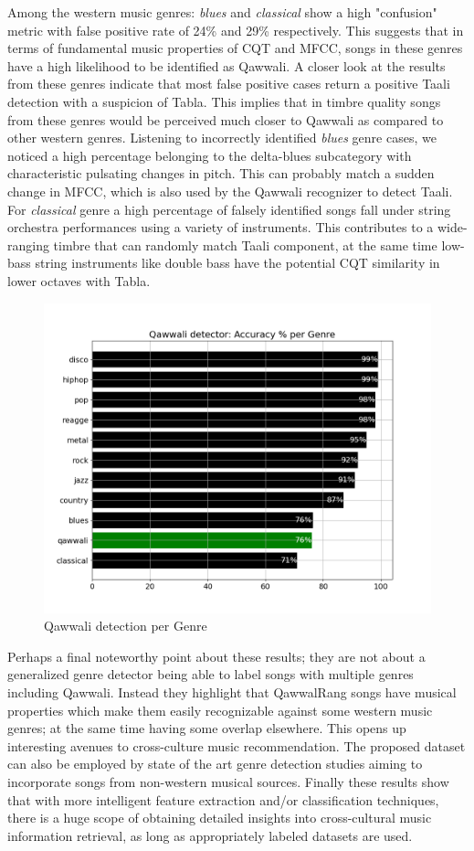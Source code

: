 \documentclass{article}
\begin{document}
Among the western music genres: \textit{blues} and \textit{classical} show a high "confusion" metric with false positive rate of 24\% and 29\% respectively. This suggests that in terms of fundamental music properties of CQT and MFCC, songs in these genres have a high likelihood to be identified as Qawwali. A closer look at the results from these genres indicate that most false positive cases return a positive Taali detection with a suspicion of Tabla. This implies that in timbre quality songs from these genres would be perceived much closer to Qawwali as compared to other western genres. Listening to incorrectly identified \textit{blues} genre cases, we noticed a high percentage belonging to the delta-blues subcategory with characteristic pulsating changes in pitch. This can probably match a sudden change in MFCC, which is also used by the Qawwali recognizer to detect Taali. For \textit{classical} genre a high percentage of falsely identified songs fall under string orchestra performances using a variety of instruments. This contributes to a wide-ranging timbre that can randomly match Taali component, at the same time low-bass string instruments like double bass have the potential CQT similarity in lower octaves with Tabla.

\begin{figure}[htbp]
  \centering
  \includegraphics[scale=1.0, width=0.95\columnwidth]{genreA}
  \caption{Qawwali detection per Genre}
\label{fig:src_genre}
\end{figure}

Perhaps a final noteworthy point about these results; they are not about a generalized genre detector being able to label songs with multiple genres including Qawwali. Instead they highlight that QawwalRang songs have musical properties which make them easily recognizable against some western music genres; at the same time having some overlap elsewhere. This opens up interesting avenues to cross-culture music recommendation. The proposed dataset can also be employed by state of the art genre detection studies aiming to incorporate songs from non-western musical sources. Finally these results show that with more intelligent feature extraction and/or classification techniques, there is a huge scope of obtaining detailed insights into cross-cultural music information retrieval, as long as appropriately labeled datasets are used.
\end{document}
